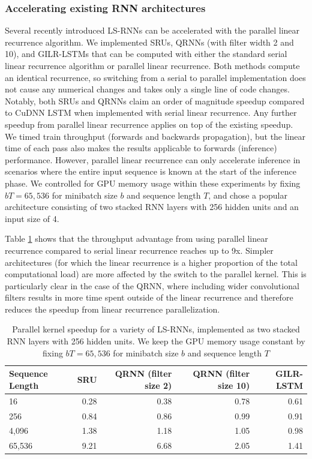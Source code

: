 \documentclass{article}
\begin{document}
\subsubsection{Accelerating existing RNN architectures}
Several recently introduced LS-RNNs can be accelerated with the parallel linear
recurrence algorithm. We implemented SRUs, QRNNs (with filter width 2 and 10),
and GILR-LSTMs that can be computed with either the standard serial linear
recurrence algorithm or parallel linear recurrence. Both methods compute an
identical recurrence, so switching from a serial to parallel implementation does
not cause any numerical changes and takes only a single line of code changes.
Notably, both SRUs and QRNNs claim an order of magnitude speedup compared to
CuDNN LSTM when implemented with serial linear recurrence. Any further speedup
from parallel linear recurrence applies on top of the existing speedup.  We
timed train throughput (forwards and backwards propagation), but the linear time
of each pass also makes the results applicable to forwards (inference)
performance. However, parallel linear recurrence can only accelerate inference
in scenarios where the entire input sequence is known at the start of the
inference phase.  We controlled for GPU memory usage within these experiments by
fixing $bT = 65,536$ for minibatch size $b$ and sequence length $T$, and chose a
popular architecture consisting of two stacked RNN layers with 256 hidden units
and an input size of 4.

Table \ref{table:rnn-throughput} shows that the
throughput advantage from using parallel linear recurrence compared to
serial linear recurrence reaches up to 9x. Simpler architectures
(for which the linear recurrence is a higher proportion of the
total computational load) are more affected by the switch to the parallel kernel.
This is
particularly clear in the case of the QRNN, where including wider
convolutional filters results in more time spent outside of the linear recurrence and
therefore reduces the speedup from linear recurrence parallelization.
\begin{table}[t]
  \caption{Parallel kernel speedup for a variety of LS-RNNs, implemented as two
    stacked RNN layers with 256 hidden units. We keep the GPU memory usage constant
  by fixing $bT = 65,536$ for minibatch size $b$ and sequence length $T$}
\begin{center}
\begin{tabular}{@{}lrrrr@{}}
\label{table:rnn-throughput}
Sequence Length & SRU & QRNN (filter size 2) & QRNN (filter size 10) & GILR-LSTM\\ \midrule
16 & 0.28 & 0.38 & 0.78 & 0.61\\
256 & 0.84 & 0.86 & 0.99 & 0.91\\
4,096 & 1.38 & 1.18 & 1.05 & 0.98\\
65,536 & 9.21 & 6.68 & 2.05 & 1.41\\ \bottomrule
\end{tabular}
\end{center}
\end{table}
\end{document}
